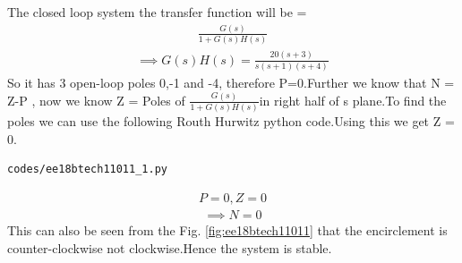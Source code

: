 The closed loop system the transfer function will be =
\begin{align}
    \frac{G(s)}{1+G(s)H(s)}
\end{align}
\begin{align}
    \implies G(s)H(s)= \frac{20(s+3)}{s(s+1)(s+4)}
\end{align}
 So it has 3 open-loop poles 0,-1 and -4, therefore P=0.Further we know that N = Z-P , now we know Z = Poles of $\frac{G(s)}{1+G(s)H(s)}$in right half of s plane.To find the poles we can use the following Routh Hurwitz python code.Using this we get Z = 0.
 \begin{lstlisting}
codes/ee18btech11011_1.py
\end{lstlisting}
\begin{align}
    P = 0 , Z = 0
\end{align}
\begin{align}
    \implies N= 0
\end{align}
This can also be seen from the Fig. \ref{fig:ee18btech11011} that the encirclement is counter-clockwise not clockwise.Hence the system is stable.


